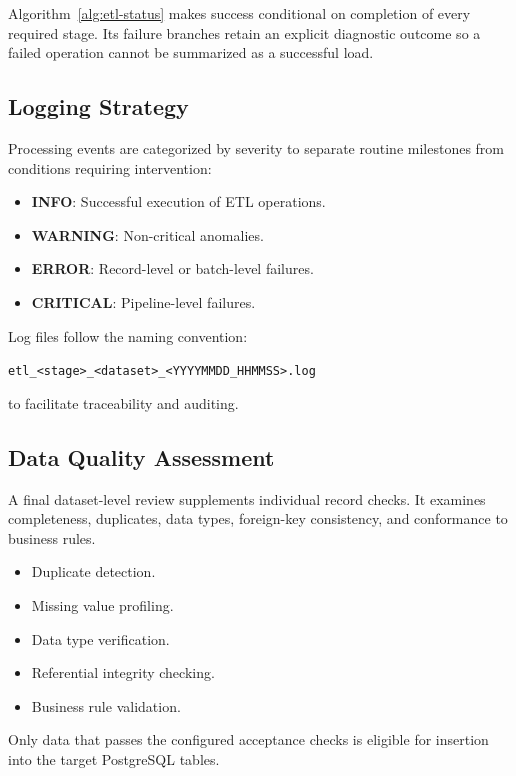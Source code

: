 \documentclass[conference]{IEEEtran}
\begin{document}
Algorithm~\ref{alg:etl-status} makes success conditional on completion of every required stage. Its failure branches retain an explicit diagnostic outcome so a failed operation cannot be summarized as a successful load.

\subsection{Logging Strategy}

Processing events are categorized by severity to separate routine milestones from conditions requiring intervention:

\begin{itemize}
    \item \textbf{INFO}: Successful execution of ETL operations.
    \item \textbf{WARNING}: Non-critical anomalies.
    \item \textbf{ERROR}: Record-level or batch-level failures.
    \item \textbf{CRITICAL}: Pipeline-level failures.
\end{itemize}

Log files follow the naming convention:

\begin{center}
\texttt{etl\_<stage>\_<dataset>\_<YYYYMMDD\_HHMMSS>.log}
\end{center}

to facilitate traceability and auditing.

\subsection{Data Quality Assessment}

A final dataset-level review supplements individual record checks. It examines completeness, duplicates, data types, foreign-key consistency, and conformance to business rules.

\begin{itemize}
    \item Duplicate detection.
    \item Missing value profiling.
    \item Data type verification.
    \item Referential integrity checking.
    \item Business rule validation.
\end{itemize}

Only data that passes the configured acceptance checks is eligible for insertion into the target PostgreSQL tables.
\end{document}
